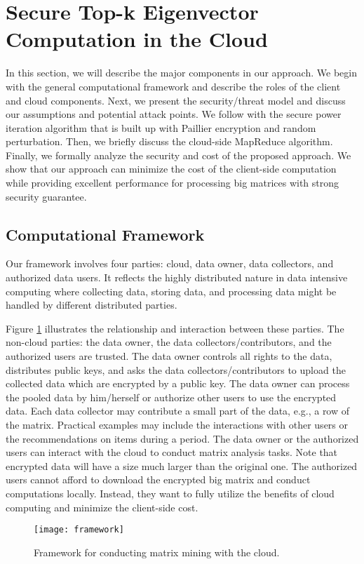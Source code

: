 \documentclass[10pt, conference, compsocconf]{IEEEtran}
\begin{document}
\section{Secure Top-k Eigenvector Computation in the Cloud}\label{sec:approach}
In this section, we will describe the major components in our approach. We begin with the general computational framework and describe the roles of the client and cloud components. Next, we present the security/threat model and discuss our assumptions and potential attack points. We follow with the secure power iteration algorithm that is built up with Paillier encryption and random perturbation. Then, we briefly discuss the cloud-side MapReduce algorithm. Finally, we formally analyze the security and cost of the proposed approach. We show that our approach can minimize the cost of the client-side computation while providing excellent performance for processing big matrices with strong security guarantee.

\subsection{Computational Framework}

Our framework involves four parties: cloud, data owner, data collectors, and authorized data users. It reflects the highly distributed nature in data intensive computing where collecting data, storing data, and processing data might be handled by different distributed parties. 

Figure \ref{fig:framework} illustrates the relationship and interaction between these parties. The non-cloud parties: the data owner, the data collectors/contributors, and the authorized users are trusted. The data owner controls all rights to the data, distributes public keys, and asks the data collectors/contributors to upload the collected data which are encrypted by a public key. The data owner can process the pooled data by him/herself or authorize other users to use the encrypted data. Each data collector may contribute a small part of the data, e.g., a row of the matrix. Practical examples may include the interactions with other users or the recommendations on items during a period. The data owner or the authorized users can interact with the cloud to conduct matrix analysis tasks. Note that encrypted data will have a size much larger than the original one. The authorized users cannot afford to download the encrypted big matrix and conduct computations locally. Instead, they want to fully utilize the benefits of cloud computing and minimize the client-side cost. 
\begin{figure}[tbh]
\centering
\begin{minipage}{\linewidth}
\centering
\texttt{[image: framework]}
\caption{Framework for conducting matrix mining with the cloud.}\label{fig:framework}
\end{minipage}
\end{figure}
\end{document}
